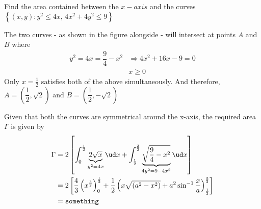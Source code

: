 \question[4] Find the area contained between the $x-axis$ 
and the curves $\left\{ (x,y): y^2 \leq 4x,\, 4x^2+4y^2\leq 9\right\}$
  \ifprintanswers
    \begin{marginfigure} 
    \end{marginfigure}
  \fi
\begin{solution}[\fullpage]
  The two curves - as shown in the figure alongside - will intersect 
  at points $A$ and $B$ where \\
  \begin{align}
    y^2 = 4x = \dfrac{9}{4}-x^2 &\Rightarrow 4x^2+16x-9=0 \\ 
    & x \geq 0
  \end{align} 
  Only $x=\frac{1}{2}$ satisfies both of the above simultaneously. And 
  therefore, $A=\left( \dfrac{1}{2},\sqrt{2}\right)$ and 
  $B=\left( \dfrac{1}{2},-\sqrt{2}\right)$

  \vspace{1cm} 
  Given that both the curves are symmetrical around the x-axis, the 
  required area $\Gamma$ is given by 
  \begin{align}
    \Gamma &= 2\left[ 
                \int_0^{\frac{1}{2}}\underbrace{2\sqrt{x}}_{y^2=4x}\ud x + 
                \int_{\frac{1}{2}}^{\frac{3}{2}}\underbrace{
                    \sqrt{\dfrac{9}{4}-x^2}
                    }_{4y^2=9-4x^2}\ud x
              \right] \\
           &= 2\left[
                \dfrac{4}{3}\left( x^{\frac{3}{2}}\right)_0^{\frac{1}{2}} +
                \dfrac{1}{2}\left( 
                              x\sqrt{(a^2-x^2)}+a^2\sin^{-1}\dfrac{x}{a}
                            \right)_{\frac{1}{2}}^{\frac{3}{2}}
              \right] \\ 
          &= \texttt{something}
  \end{align} 
\end{solution} 
